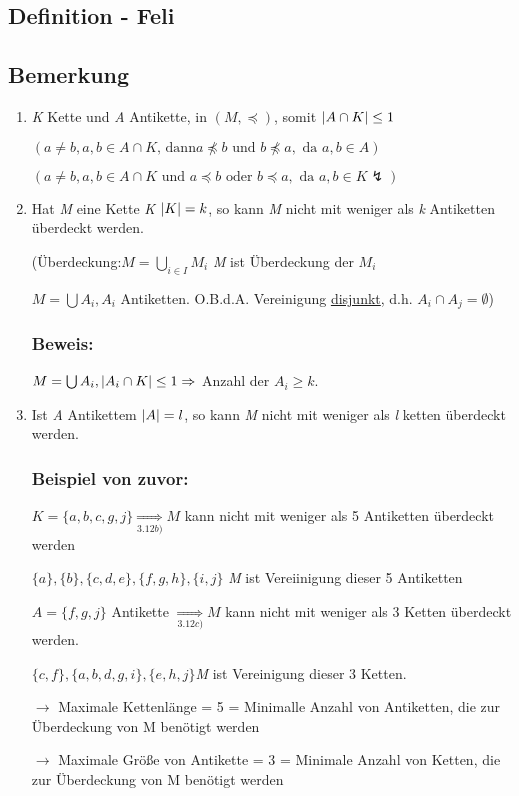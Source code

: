 \subsection{Definition - Feli}
\subsection{Bemerkung}
\begin{enumerate}
	\item \textit{K} Kette und \textit{A} Antikette, in $(M ,\preceq )$, somit $\left|A \cap K\right| \leq 1$
	
	$(a\neq b,a,b \in A \cap K \text{, dann} a \npreceq b\text{ und } b \npreceq a, \text{ da } a,b \in A)$
	
	$(a\neq b,a,b \in A \cap K \text{ und } a \preceq b\text{ oder } b \preceq a, \text{ da } a,b \in K \lightning)$
	
	\item Hat \textit{M} eine Kette \textit{K} $\left|K\right|=k$, so kann \textit{M} nicht mit weniger als \textit{k} Antiketten überdeckt werden.
	
	(Überdeckung:$ M=\underset{i \in I}{\bigcup} M_i$ \textit{M} ist Überdeckung der $M_i$
	
	$M= \bigcup A_i, A_i$ Antiketten. O.B.d.A. Vereinigung \underline{disjunkt}, d.h. $A_i \cap A_j = \emptyset$)
	
	\subsubsection*{Beweis:}
	$M=\bigcup A_i, \left|A_i \cap K\right|\leq 1 \Rightarrow $ Anzahl der $A_i \geq k$.
	
	\item Ist \textit{A} Antikettem $\left|A\right| = l$, so kann \textit{M} nicht mit weniger als \textit{l} ketten überdeckt werden.
	
	\subsubsection*{Beispiel von zuvor:}
	
	$K= \{a,b,c,g,j\} \underset{3.12 b)}{\Rightarrow} M$ kann nicht mit weniger als 5 Antiketten überdeckt werden
	
	$\{a\}, \{b\}, \{c,d,e\}, \{f,g,h\},\{i,j\}$ \textit{M} ist Vereiinigung dieser 5 Antiketten
	
	$A=\{f,g,j\}$ Antikette $ \underset{3.12 c)}{\Rightarrow} M$ kann nicht mit weniger als 3 Ketten überdeckt werden.
	
	$\{c,f\},\{a,b,d,g,i\},\{e,h,j\}$\textit{M} ist Vereinigung dieser 3 Ketten.
	
	$\rightarrow $ Maximale Kettenlänge = 5 = Minimalle Anzahl von Antiketten, die zur Überdeckung von M benötigt werden
	
	$\rightarrow$ Maximale Größe von Antikette = 3 = Minimale Anzahl von Ketten, die zur Überdeckung von M benötigt werden
\end{enumerate}

